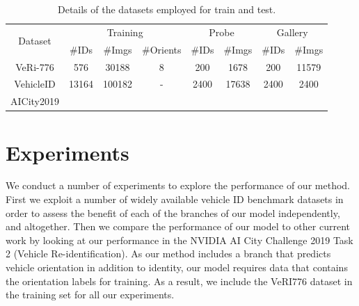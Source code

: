 \documentclass[10pt,twocolumn,letterpaper]{article}
\begin{document}

\begin{table}
  \centering
  \begin{tabular}{c || c | c | c || c | c || c | c}
    \hline
    \multirow{2}{*}{Dataset} & \multicolumn{3}{c||}{Training} & \multicolumn{2}{c||}{Probe} & \multicolumn{2}{c}{Gallery} \\
    \cline{2-8}
    & \#IDs& \#Imgs & \#Orients & \#IDs & \#Imgs & \#IDs & \#Imgs \\
    \hline
    VeRi-776 \cite{liu2016veri}
    & 576 & 30188 & 8 & 200 & 1678 & 200 & 11579 \\
    VehicleID \cite{liu2016vehicleid}
    & 13164 & 100182 & - & 2400 & 17638 & 2400 & 2400 \\
    AICity2019 \cite{} & \\
    \hline
  \end{tabular}
  \caption{Details of the datasets employed for train and test.}
  \label{T:dataset_details}
\end{table}





\section{Experiments}
We conduct a number of experiments to explore the performance of our method. First we exploit a number of widely available vehicle ID benchmark datasets in order to assess the benefit of each of the branches of our model independently, and altogether. Then we compare the performance of our model to other current work by looking at our performance in the NVIDIA AI City Challenge 2019 Task 2 (Vehicle Re-identification). As our method includes a branch that predicts vehicle orientation in addition to identity, our model requires data that contains the orientation labels for training. As a result, we include the VeRI776 \cite{liu2016veri} dataset in the training set for all our experiments.
\end{document}
